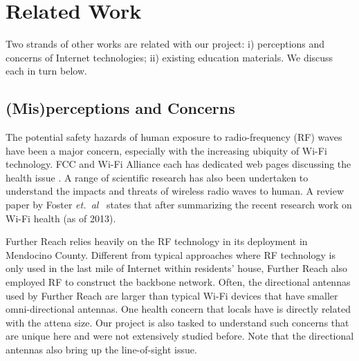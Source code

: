 \section{Related Work}
\label{sec:related-work}

Two strands of other works are related with our project: i) perceptions and
concerns of Internet technologies; ii) existing education materials. We discuss
each in turn below.

\subsection{(Mis)perceptions and Concerns}
\label{sec:conc-misp}

The potential safety hazards of human exposure to radio-frequency (RF) waves
have been a major concern, especially with the increasing ubiquity of Wi-Fi
technology. FCC and Wi-Fi Alliance each has dedicated web pages discussing the
health issue \cite{fcc2015radio, wifi2015health}. A range of scientific research
has also been undertaken to understand the impacts and threats of wireless radio
waves to human. A review paper by Foster {\em et.~al}~\cite{foster2013wi} states
that 
after summarizing the recent research work on Wi-Fi health (as of 2013).

Further Reach relies heavily on the RF technology in its deployment in Mendocino
County. Different from typical approaches where RF technology is only used in
the last mile of Internet within residents' house, Further Reach also employed
RF to construct the backbone network. Often, the directional antennas used by
Further Reach are larger than typical Wi-Fi devices that have smaller
omni-directional antennas. One health concern that locals have is directly
related with the attena size. Our project is also tasked to understand such
concerns that are unique here and were not extensively studied before. Note that
the directional antennas also bring up the line-of-sight issue.

